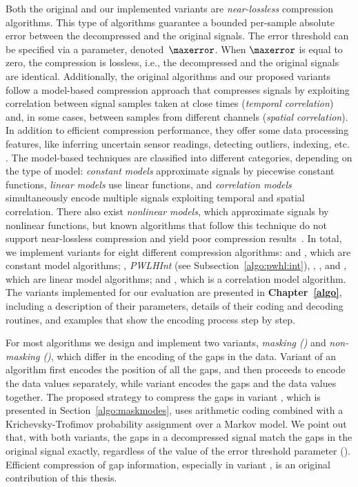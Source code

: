 Both the original and our implemented variants are \textit{near-lossless} compression algorithms. This type of algorithms guarantee a bounded per-sample absolute error between the decompressed and the original signals. The error threshold can be specified via a parameter, denoted~$\maxerror$. When $\maxerror$ is equal to zero, the compression is lossless, i.e., the decompressed and the original signals are identical. Additionally, the original algorithms and our proposed variants follow a model-based compression approach that compresses signals by exploiting correlation between signal samples taken at close times (\textit{temporal correlation}) and, in some cases, between samples from different channels (\textit{spatial correlation}). In addition to efficient compression performance, they offer some data processing features, like inferring uncertain sensor readings, detecting outliers, indexing, etc. \cite{AnEva2013}. The model-based techniques are classified into different categories, depending on the type of model: \textit{constant models} approximate signals by piecewise constant functions, \textit{linear models} use linear functions, and \textit{correlation models} simultaneously encode multiple signals exploiting temporal and spatial correlation. There also exist \textit{nonlinear models}, which approximate signals by nonlinear functions, but known algorithms that follow this technique do not support near-lossless compression and yield poor compression results~\cite{AnEva2013}. In total, we implement variants for eight different compression algorithms: \textit{\PCAfull} \cite{coder:pca} and \textit{\APCAfull} \cite{coder:apca}, which are constant model algorithms; \textit{\PWLHfull} \cite{coder:pwlh}, \textit{PWLHInt} (see Subsection~\ref{algo:pwhl:int}), \textit{\CAfull} \cite{coder:ca}, \textit{\SFfull} \cite{coder:sf}, and \textit{\FRfull} \cite{coder:fr}, which are linear model algorithms; and \textit{\GAMPSfull} \cite{coder:gamps}, which is a correlation model algorithm. The variants implemented for our evaluation are presented in \textbf{Chapter~\ref{algo}}, including a description of their parameters, details of their coding and decoding routines, and examples that show the encoding process step by step.


For most algorithms we design and implement two variants, \textit{masking (\maskalgo)} and \textit{non-masking (\NOmaskalgo)}, which differ in the encoding of the gaps in the data. Variant \maskalgo of an algorithm first encodes the position of all the gaps, and then proceeds to encode the data values separately, while variant \NOmaskalgo encodes the gaps and the data values together. The proposed strategy to compress the gaps in variant \maskalgo, which is presented in Section~\ref{algo:maskmodes}, uses arithmetic coding \cite{ac2, Cover2005} combined with a Krichevsky-Trofimov probability assignment \cite{ktestimator} over a Markov model. We point out that, with both variants, the gaps in a decompressed signal match the gaps in the original signal exactly, regardless of the value of the error threshold parameter (\maxerror). Efficient compression of gap information, especially in variant \maskalgo, is an original contribution of this thesis.


